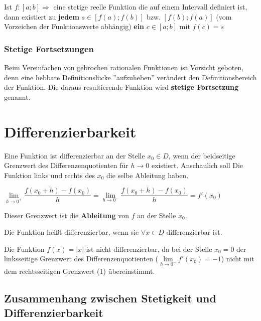 \documentclass[main.tex]{subfiles}
\begin{document}
\begin{Theorem}[Zwischenwertsatz]
	Ist $f:[a;b]\Rightarrow$ eine stetige reelle Funktion die auf einem Intervall definiert ist, dann existiert zu \textbf{jedem} $s \in [f(a);f(b)]$ bzw. $[f(b);f(a)]$ (vom Vorzeichen der Funktionswerte abhängig) \textbf{ein} $c \in [a;b] $ mit $f(c)=s$
\end{Theorem}


\subsubsection{Stetige Fortsetzungen}

Beim Vereinfachen von gebrochen rationalen Funktionen ist Vorsicht geboten, denn eine hebbare Definitionslücke ''aufzuheben'' verändert den Definitionsbereich der Funktion. Die daraus resultierende Funktion wird \textbf{stetige Fortsetzung} genannt.



\section{Differenzierbarkeit}

\begin{Definition}
	Eine Funktion ist differenzierbar an der Stelle $x_{0} \in D$, wenn der beidseitige Grenzwert des Differenzenquotienten für $h\rightarrow 0$ existiert. Anschaulich soll Die Funktion links und rechts des $x_{0}$ die selbe Ableitung haben.

	$\lim\limits_{h \rightarrow 0^{+}} {\dfrac{f(x_{0}+h)-f(x_{0})}{h}} = \lim\limits_{h \rightarrow 0^{-}} {\dfrac{f(x_{0}+h)-f(x_{0})}{h}} =f'(x_{0})$

	Dieser Grenzwert ist die \textbf{Ableitung} von $f$ an der Stelle $x_{0}$.

	Die Funktion heißt differenzierbar, wenn sie $\forall x \in D$ differenzierbar ist.
\end{Definition}


Die Funktion $f(x)=|x|$ ist nicht differenzierbar, da bei der Stelle $x_{0}=0$ der linksseitige Grenzwert des Differenzenquotienten ($\lim\limits_{h \rightarrow 0^{-}}{f'(x_{0})=-1}$) nicht mit dem rechtsseitigen Grenzwert (1) übereinstimmt.


\subsection{Zusammenhang zwischen Stetigkeit und Differenzierbarkeit}
\end{document}
